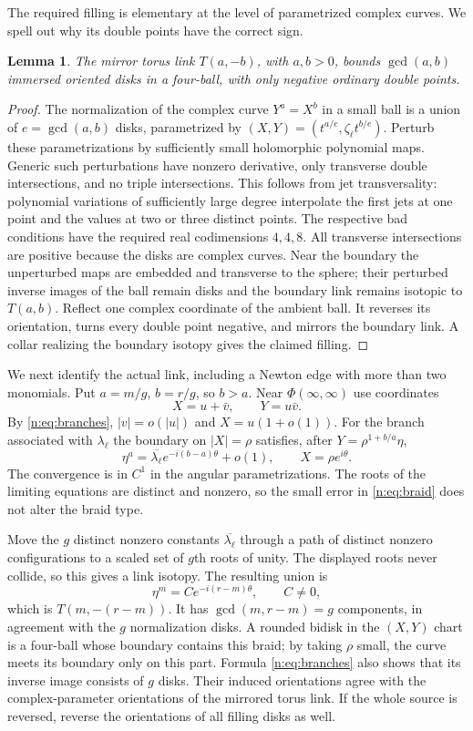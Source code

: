 \documentclass[UTF8,11pt]{ctexart}
\newtheorem{lem}[thm]{Lemma}
\theoremstyle{definition}
\numberwithin{equation}{section}
\begin{document}
The required filling is elementary at the level of parametrized complex
curves. We spell out why its double points have the correct sign.
\begin{lem}\label{n:lem:cap}
The mirror torus link $T(a,-b)$, with $a,b>0$, bounds
$\gcd(a,b)$ immersed oriented disks in a four-ball, with only negative
ordinary double points.
\end{lem}
\begin{proof}
The normalization of the complex curve $Y^a=X^b$ in a small ball is a
union of $e=\gcd(a,b)$ disks, parametrized by
$(X,Y)=(t^{a/e},\zeta_\ell t^{b/e})$. Perturb these parametrizations by
sufficiently small holomorphic polynomial maps. Generic such perturbations
have nonzero derivative, only transverse double intersections, and no
triple intersections. This follows from jet transversality: polynomial
variations of sufficiently large degree interpolate the first jets at one
point and the values at two or three distinct points. The respective bad
conditions have the required real codimensions $4,4,8$.
All transverse intersections are positive because the disks are complex
curves. Near the boundary the unperturbed maps are embedded and transverse
to the sphere; their perturbed inverse images of the ball remain disks and
the boundary link remains isotopic to $T(a,b)$.
Reflect one complex coordinate of the ambient ball. It reverses its
orientation, turns every double point negative, and mirrors the boundary
link. A collar realizing the boundary isotopy gives the claimed filling.
\end{proof}

We next identify the actual link, including a Newton edge with more than two
monomials. Put $a=m/g$, $b=r/g$, so $b>a$. Near $\Phi(\infty,\infty)$
use coordinates
\[
 X=u+\bar v,\qquad Y=u\bar v.
\]
By \eqref{n:eq:branches}, $|v|=o(|u|)$ and $X=u(1+o(1))$.
For the branch associated with $\lambda_\ell$ the boundary on $|X|=\rho$
satisfies, after $Y=\rho^{1+b/a}\eta$,
\begin{equation}\label{n:eq:braid}
 \eta^a=\overline{\lambda_\ell}e^{-i(b-a)\theta}+o(1),
 \qquad X=\rho e^{i\theta}.
\end{equation}
The convergence is in $C^1$ in the angular parametrizations. The roots of
the limiting equations are distinct and nonzero, so the small error in
\eqref{n:eq:braid} does not alter the braid type.

Move the $g$ distinct nonzero constants $\overline{\lambda_\ell}$ through
a path of distinct nonzero configurations to a scaled set of $g$th roots
of unity. The displayed roots never collide, so this gives a link isotopy.
The resulting union is
\[
 \eta^m=C e^{-i(r-m)\theta},\qquad C\ne0,
\]
which is $T(m,-(r-m))$. It has $\gcd(m,r-m)=g$ components, in agreement
with the $g$ normalization disks. A rounded bidisk in the $(X,Y)$ chart
is a four-ball whose boundary contains this braid; by taking $\rho$ small,
the curve meets its boundary only on this part. Formula
\eqref{n:eq:branches} also shows that its inverse image consists of $g$
disks. Their induced orientations agree with the complex-parameter
orientations of the mirrored torus link. If the whole source is reversed,
reverse the orientations of all filling disks as well.
\end{document}
